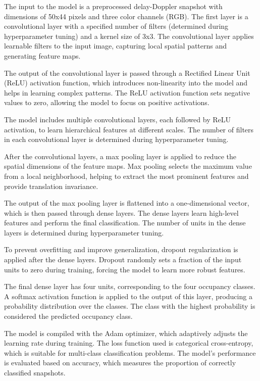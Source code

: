 \documentclass{article}
\begin{document}
The input to the model is a preprocessed delay-Doppler snapshot with dimensions of 50x44 pixels and three color channels (RGB). The first layer is a convolutional layer with a specified number of filters (determined during hyperparameter tuning) and a kernel size of 3x3. The convolutional layer applies learnable filters to the input image, capturing local spatial patterns and generating feature maps.

The output of the convolutional layer is passed through a Rectified Linear Unit (ReLU) activation function, which introduces non-linearity into the model and helps in learning complex patterns. The ReLU activation function sets negative values to zero, allowing the model to focus on positive activations.

The model includes multiple convolutional layers, each followed by ReLU activation, to learn hierarchical features at different scales. The number of filters in each convolutional layer is determined during hyperparameter tuning.

After the convolutional layers, a max pooling layer is applied to reduce the spatial dimensions of the feature maps. Max pooling selects the maximum value from a local neighborhood, helping to extract the most prominent features and provide translation invariance.

The output of the max pooling layer is flattened into a one-dimensional vector, which is then passed through dense layers. The dense layers learn high-level features and perform the final classification. The number of units in the dense layers is determined during hyperparameter tuning.

To prevent overfitting and improve generalization, dropout regularization is applied after the dense layers. Dropout randomly sets a fraction of the input units to zero during training, forcing the model to learn more robust features.

The final dense layer has four units, corresponding to the four occupancy classes. A softmax activation function is applied to the output of this layer, producing a probability distribution over the classes. The class with the highest probability is considered the predicted occupancy class.

The model is compiled with the Adam optimizer, which adaptively adjusts the learning rate during training. The loss function used is categorical cross-entropy, which is suitable for multi-class classification problems. The model's performance is evaluated based on accuracy, which measures the proportion of correctly classified snapshots.
\end{document}
